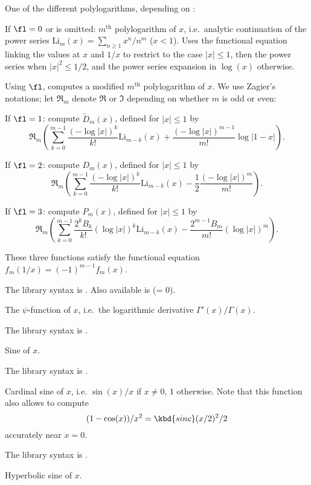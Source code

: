 \label{se:polylog}
One of the different polylogarithms, depending on \fl:

If $\fl=0$ or is omitted: $m^\text{th}$ polylogarithm of $x$, i.e.~analytic
continuation of the power series $\text{Li}_m(x)=\sum_{n\ge1}x^n/n^m$
($x < 1$). Uses the functional equation linking the values at $x$ and $1/x$
to restrict to the case $|x|\leq 1$, then the power series when
$|x|^2\le1/2$, and the power series expansion in $\log(x)$ otherwise.

Using $\fl$, computes a modified $m^\text{th}$ polylogarithm of $x$.
We use Zagier's notations; let $\Re_m$ denote $\Re$ or $\Im$ depending
on whether $m$ is odd or even:

If $\fl=1$: compute $\tilde D_m(x)$, defined for $|x|\le1$ by
$$\Re_m\left(\sum_{k=0}^{m-1} \dfrac{(-\log|x|)^k}{k!}\text{Li}_{m-k}(x)
+\dfrac{(-\log|x|)^{m-1}}{m!}\log|1-x|\right).$$

If $\fl=2$: compute $D_m(x)$, defined for $|x|\le1$ by
$$\Re_m\left(\sum_{k=0}^{m-1}\dfrac{(-\log|x|)^k}{k!}\text{Li}_{m-k}(x)
-\dfrac{1}{2}\dfrac{(-\log|x|)^m}{m!}\right).$$

If $\fl=3$: compute $P_m(x)$, defined for $|x|\le1$ by
$$\Re_m\left(\sum_{k=0}^{m-1}\dfrac{2^kB_k}{k!}(\log|x|)^k\text{Li}_{m-k}(x)
-\dfrac{2^{m-1}B_m}{m!}(\log|x|)^m\right).$$

These three functions satisfy the functional equation
$f_m(1/x) = (-1)^{m-1}f_m(x)$.

The library syntax is .
Also available is
 (\fl = 0).

\label{se:psi}
The $\psi$-function of $x$, i.e.~the logarithmic derivative
$\Gamma'(x)/\Gamma(x)$.

The library syntax is .

\label{se:sin}
Sine of $x$.

The library syntax is .

\label{se:sinc}
Cardinal sine of $x$, i.e. $\sin(x)/x$ if $x\neq 0$, $1$ otherwise.
Note that this function also allows to compute
$$(1-\cos(x)) / x^2 = \kbd{sinc}(x/2)^2 / 2$$
accurately near $x = 0$.

The library syntax is .

\label{se:sinh}
Hyperbolic sine of $x$.

